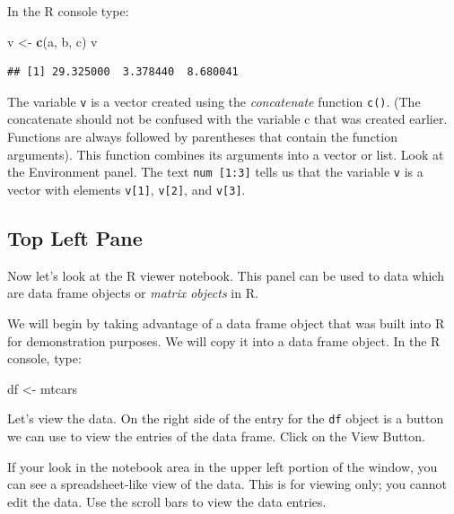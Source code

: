 \documentclass[
]{book}
\newenvironment{Shaded}{\begin{snugshade}}{\end{snugshade}}
\newcommand{\KeywordTok}[1]{\textcolor[rgb]{0.13,0.29,0.53}{\textbf{#1}}}
\newcommand{\NormalTok}[1]{#1}
\newcommand{\StringTok}[1]{\textcolor[rgb]{0.31,0.60,0.02}{#1}}
\begin{document}
In the R console type:

\begin{Shaded}
\begin{Highlighting}[]
\NormalTok{v <-}\StringTok{ }\KeywordTok{c}\NormalTok{(a, b, c)}
\NormalTok{v}
\end{Highlighting}
\end{Shaded}

\begin{verbatim}
## [1] 29.325000  3.378440  8.680041
\end{verbatim}

The variable \texttt{v} is a vector created using the \emph{concatenate} function \texttt{c()}. (The concatenate should not be confused with the variable c that was created earlier. Functions are always followed by parentheses that contain the function arguments). This function combines its arguments into a vector or list. Look at the Environment panel. The text \texttt{num\ {[}1:3{]}} tells us that the variable \texttt{v} is a vector with elements \texttt{v{[}1{]}}, \texttt{v{[}2{]}}, and \texttt{v{[}3{]}}.

\hypertarget{top-left-pane}{%
\subsection*{Top Left Pane}\label{top-left-pane}}

Now let's look at the R viewer notebook. This panel can be used to data which are data frame objects or \emph{matrix objects} in R.

We will begin by taking advantage of a data frame object that was built into R for demonstration purposes. We will copy it into a data frame object. In the R console, type:

\begin{Shaded}
\begin{Highlighting}[]
\NormalTok{df <-}\StringTok{ }\NormalTok{mtcars}
\end{Highlighting}
\end{Shaded}

Let's view the data. On the right side of the entry for the \texttt{df} object is a button we can use to view the entries of the data frame. Click on the View Button.

If your look in the notebook area in the upper left portion of the window, you can see a spreadsheet-like view of the data. This is for viewing only; you cannot edit the data. Use the scroll bars to view the data entries.
\end{document}
